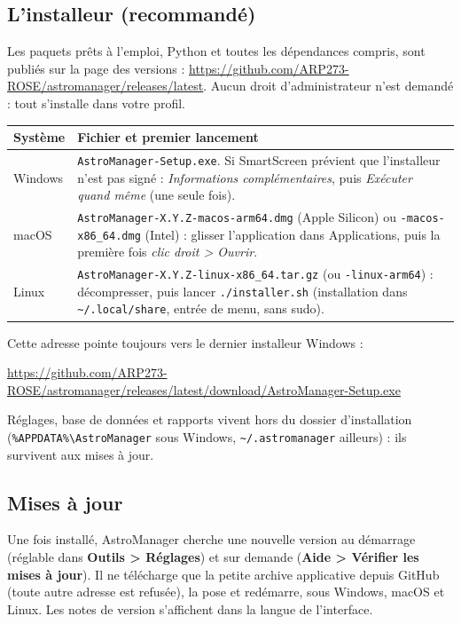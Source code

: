 \documentclass[a4paper,11pt]{article}
\newcommand{\menu}[1]{\textsf{\textbf{\textcolor{sky}{#1}}}}
\begin{document}
\subsection{L'installeur (recommandé)}

Les paquets prêts à l'emploi, Python et toutes les dépendances compris, sont
publiés sur la page des versions :
\url{https://github.com/ARP273-ROSE/astromanager/releases/latest}. Aucun droit
d'administrateur n'est demandé : tout s'installe dans votre profil.

\begin{center}
\begin{tabularx}{\linewidth}{@{}l>{\raggedright\arraybackslash}X@{}}
\toprule
\textbf{Système} & \textbf{Fichier et premier lancement} \\
\midrule
Windows & \texttt{AstroManager-Setup.exe}. Si SmartScreen prévient que
l'installeur n'est pas signé : \emph{Informations complémentaires}, puis
\emph{Exécuter quand même} (une seule fois). \\
macOS & \texttt{AstroManager-X.Y.Z-macos-arm64.dmg} (Apple Silicon) ou
\texttt{-macos-x86\_64.dmg} (Intel) : glisser l'application dans Applications,
puis la première fois \emph{clic droit > Ouvrir}. \\
Linux & \texttt{AstroManager-X.Y.Z-linux-x86\_64.tar.gz} (ou \texttt{-linux-arm64}) :
décompresser, puis lancer \texttt{./installer.sh} (installation dans
\texttt{\textasciitilde/.local/share}, entrée de menu, sans sudo). \\
\bottomrule
\end{tabularx}
\end{center}

Cette adresse pointe toujours vers le dernier installeur Windows :
\begin{center}\footnotesize\url{https://github.com/ARP273-ROSE/astromanager/releases/latest/download/AstroManager-Setup.exe}\end{center}

Réglages, base de données et rapports vivent hors du dossier d'installation
(\texttt{\%APPDATA\%\textbackslash AstroManager} sous Windows,
\texttt{\textasciitilde/.astromanager} ailleurs) : ils survivent aux mises à jour.

\subsection{Mises à jour}

Une fois installé, AstroManager cherche une nouvelle version au démarrage
(réglable dans \menu{Outils > Réglages}) et sur demande
(\menu{Aide > Vérifier les mises à jour}). Il ne télécharge que la petite
archive applicative depuis GitHub (toute autre adresse est refusée), la pose et
redémarre, sous Windows, macOS et Linux. Les notes de version s'affichent dans la
langue de l'interface.
\end{document}
